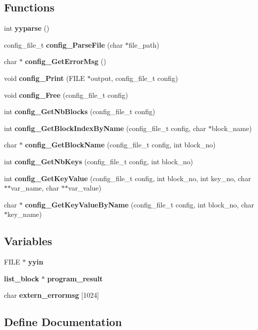 \subsection*{Functions}
\begin{CompactItemize}
\item 
int {\bf yyparse} ()
\item 
config\_\-file\_\-t {\bf config\_\-Parse\-File} (char $\ast$file\_\-path)
\item 
char $\ast$ {\bf config\_\-Get\-Error\-Msg} ()
\item 
void {\bf config\_\-Print} (FILE $\ast$output, config\_\-file\_\-t config)
\item 
void {\bf config\_\-Free} (config\_\-file\_\-t config)
\item 
int {\bf config\_\-Get\-Nb\-Blocks} (config\_\-file\_\-t config)
\item 
int {\bf config\_\-Get\-Block\-Index\-By\-Name} (config\_\-file\_\-t config, char $\ast$block\_\-name)
\item 
char $\ast$ {\bf config\_\-Get\-Block\-Name} (config\_\-file\_\-t config, int block\_\-no)
\item 
int {\bf config\_\-Get\-Nb\-Keys} (config\_\-file\_\-t config, int block\_\-no)
\item 
int {\bf config\_\-Get\-Key\-Value} (config\_\-file\_\-t config, int block\_\-no, int key\_\-no, char $\ast$$\ast$var\_\-name, char $\ast$$\ast$var\_\-value)
\item 
char $\ast$ {\bf config\_\-Get\-Key\-Value\-By\-Name} (config\_\-file\_\-t config, int block\_\-no, char $\ast$key\_\-name)
\end{CompactItemize}
\subsection*{Variables}
\begin{CompactItemize}
\item 
FILE $\ast$ {\bf yyin}
\item 
{\bf list\_\-block} $\ast$ {\bf program\_\-result}
\item 
char {\bf extern\_\-errormsg} [1024]
\end{CompactItemize}


\subsection{Define Documentation}
